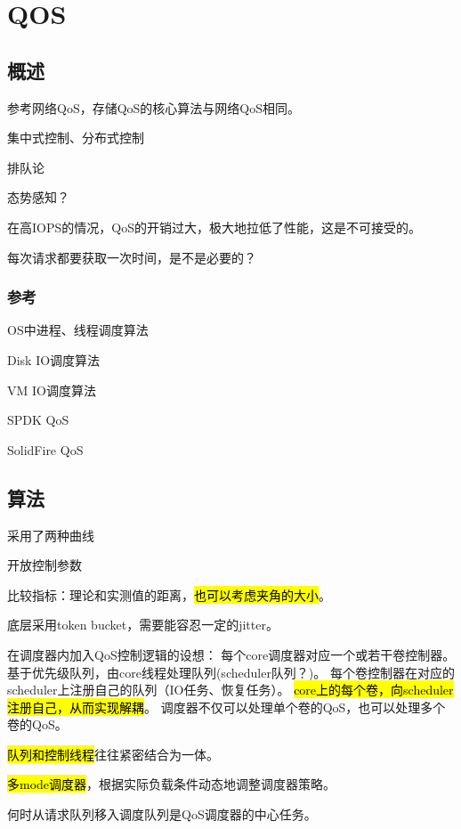 \chapter{QOS}

\section{概述}

参考网络QoS，存储QoS的核心算法与网络QoS相同。

集中式控制、分布式控制

排队论

态势感知？

在高IOPS的情况，QoS的开销过大，极大地拉低了性能，这是不可接受的。

每次请求都要获取一次时间，是不是必要的？

\subsection{参考}

\begin{enumbox}
\item OS中进程、线程调度算法
\item Disk IO调度算法
\item VM IO调度算法
\item SPDK QoS
\item SolidFire QoS
\end{enumbox}

\section{算法}

采用了两种曲线

开放控制参数

比较指标：理论和实测值的距离，\hl{也可以考虑夹角的大小}。

底层采用token bucket，需要能容忍一定的jitter。

在调度器内加入QoS控制逻辑的设想： 每个core调度器对应一个或若干卷控制器。基于优先级队列，由core线程处理队列(scheduler队列？)。
每个卷控制器在对应的scheduler上注册自己的队列（IO任务、恢复任务）。 \hl{core上的每个卷，向scheduler注册自己，从而实现解耦}。
调度器不仅可以处理单个卷的QoS，也可以处理多个卷的QoS。

\hl{队列和控制线程}往往紧密结合为一体。

\hl{多mode调度器}，根据实际负载条件动态地调整调度器策略。

何时从请求队列移入调度队列是QoS调度器的中心任务。

